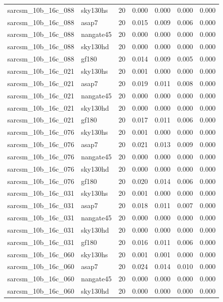 \begin{tabular}{llrrrrr}
sarcsm\_10b\_16c\_088 & sky130hs & 20 & 0.000 & 0.000 & 0.000 & 0.000 \\
sarcsm\_10b\_16c\_088 & asap7 & 20 & 0.015 & 0.009 & 0.006 & 0.000 \\
sarcsm\_10b\_16c\_088 & nangate45 & 20 & 0.000 & 0.000 & 0.000 & 0.000 \\
sarcsm\_10b\_16c\_088 & sky130hd & 20 & 0.000 & 0.000 & 0.000 & 0.000 \\
sarcsm\_10b\_16c\_088 & gf180 & 20 & 0.014 & 0.009 & 0.005 & 0.000 \\
sarcsm\_10b\_16c\_021 & sky130hs & 20 & 0.001 & 0.000 & 0.000 & 0.000 \\
sarcsm\_10b\_16c\_021 & asap7 & 20 & 0.019 & 0.011 & 0.008 & 0.000 \\
sarcsm\_10b\_16c\_021 & nangate45 & 20 & 0.000 & 0.000 & 0.000 & 0.000 \\
sarcsm\_10b\_16c\_021 & sky130hd & 20 & 0.000 & 0.000 & 0.000 & 0.000 \\
sarcsm\_10b\_16c\_021 & gf180 & 20 & 0.017 & 0.011 & 0.006 & 0.000 \\
sarcsm\_10b\_16c\_076 & sky130hs & 20 & 0.001 & 0.000 & 0.000 & 0.000 \\
sarcsm\_10b\_16c\_076 & asap7 & 20 & 0.021 & 0.013 & 0.009 & 0.000 \\
sarcsm\_10b\_16c\_076 & nangate45 & 20 & 0.000 & 0.000 & 0.000 & 0.000 \\
sarcsm\_10b\_16c\_076 & sky130hd & 20 & 0.000 & 0.000 & 0.000 & 0.000 \\
sarcsm\_10b\_16c\_076 & gf180 & 20 & 0.020 & 0.014 & 0.006 & 0.000 \\
sarcsm\_10b\_16c\_031 & sky130hs & 20 & 0.001 & 0.000 & 0.000 & 0.000 \\
sarcsm\_10b\_16c\_031 & asap7 & 20 & 0.018 & 0.011 & 0.007 & 0.000 \\
sarcsm\_10b\_16c\_031 & nangate45 & 20 & 0.000 & 0.000 & 0.000 & 0.000 \\
sarcsm\_10b\_16c\_031 & sky130hd & 20 & 0.000 & 0.000 & 0.000 & 0.000 \\
sarcsm\_10b\_16c\_031 & gf180 & 20 & 0.016 & 0.011 & 0.006 & 0.000 \\
sarcsm\_10b\_16c\_060 & sky130hs & 20 & 0.001 & 0.001 & 0.000 & 0.000 \\
sarcsm\_10b\_16c\_060 & asap7 & 20 & 0.024 & 0.014 & 0.010 & 0.000 \\
sarcsm\_10b\_16c\_060 & nangate45 & 20 & 0.000 & 0.000 & 0.000 & 0.000 \\
sarcsm\_10b\_16c\_060 & sky130hd & 20 & 0.000 & 0.000 & 0.000 & 0.000 \\

\end{tabular}
